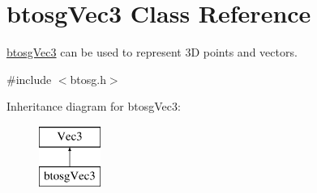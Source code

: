 \hypertarget{classbtosgVec3}{}\section{btosg\+Vec3 Class Reference}
\label{classbtosgVec3}


\hyperlink{classbtosgVec3}{btosg\+Vec3} can be used to represent 3D points and vectors.  




{\ttfamily \#include $<$btosg.\+h$>$}

Inheritance diagram for btosg\+Vec3\+:\begin{figure}[H]
\begin{center}
\leavevmode
\includegraphics[height=2.000000cm]{classbtosgVec3}
\end{center}
\end{figure}
